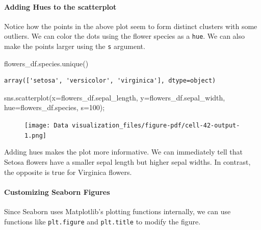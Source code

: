 \documentclass[
  letterpaper,
  DIV=11,
  numbers=noendperiod]{scrreprt}
\let\oldparagraph\paragraph
\renewcommand{\paragraph}[1]{\oldparagraph{#1}\mbox{}}
\newenvironment{Shaded}{\begin{snugshade}}{\end{snugshade}}
\newcommand{\DecValTok}[1]{\textcolor[rgb]{0.68,0.00,0.00}{#1}}
\newcommand{\NormalTok}[1]{\textcolor[rgb]{0.00,0.23,0.31}{#1}}
\newcommand{\OperatorTok}[1]{\textcolor[rgb]{0.37,0.37,0.37}{#1}}
\begin{document}
\hypertarget{adding-hues-to-the-scatterplot}{%
\paragraph{Adding Hues to the
scatterplot}\label{adding-hues-to-the-scatterplot}}

Notice how the points in the above plot seem to form distinct clusters
with some outliers. We can color the dots using the flower species as a
\texttt{hue}. We can also make the points larger using the \texttt{s}
argument.

\begin{Shaded}
\begin{Highlighting}[]
\NormalTok{flowers\_df.species.unique()}
\end{Highlighting}
\end{Shaded}

\begin{verbatim}
array(['setosa', 'versicolor', 'virginica'], dtype=object)
\end{verbatim}

\begin{Shaded}
\begin{Highlighting}[]
\NormalTok{sns.scatterplot(x}\OperatorTok{=}\NormalTok{flowers\_df.sepal\_length, y}\OperatorTok{=}\NormalTok{flowers\_df.sepal\_width, hue}\OperatorTok{=}\NormalTok{flowers\_df.species, s}\OperatorTok{=}\DecValTok{100}\NormalTok{)}\OperatorTok{;}
\end{Highlighting}
\end{Shaded}

\begin{figure}[H]

{\centering \texttt{[image: Data visualization\_files/figure-pdf/cell-42-output-1.png]}

}

\end{figure}

Adding hues makes the plot more informative. We can immediately tell
that Setosa flowers have a smaller sepal length but higher sepal widths.
In contrast, the opposite is true for Virginica flowers.

\hypertarget{customizing-seaborn-figures}{%
\paragraph{Customizing Seaborn
Figures}\label{customizing-seaborn-figures}}

Since Seaborn uses Matplotlib's plotting functions internally, we can
use functions like \texttt{plt.figure} and \texttt{plt.title} to modify
the figure.
\end{document}
